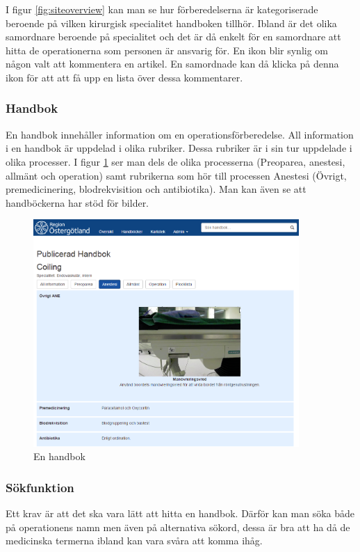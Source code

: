 I figur \ref{fig:siteoverview} kan man se hur förberedelserna är kategoriserade beroende på vilken kirurgisk specialitet handboken tillhör.
Ibland är det olika samordnare beroende på specialitet och det är då enkelt för en samordnare att hitta de operationerna som personen är ansvarig för.
En ikon blir synlig om någon valt att kommentera en artikel. En samordnade kan då klicka på denna ikon för att att få upp en lista över dessa kommentarer.

\subsubsection{Handbok}
En handbok innehåller information om en operationsförberedelse. All information i en handbok är uppdelad i olika rubriker. Dessa rubriker är i sin tur uppdelade i olika processer.
I figur \ref{fig:handbok} ser man dels de olika processerna (Preoparea, anestesi, allmänt och operation) samt rubrikerna som hör till processen Anestesi (Övrigt, premedicinering, blodrekvisition och  antibiotika). Man kan även se att handböckerna har stöd för bilder.

\begin{figure}[h!]
  \centering
  \includegraphics[width=0.9\textwidth]{images/site/handbok.png}
  \caption{En handbok}
  \label{fig:handbok}
\end{figure}



\subsubsection{Sökfunktion}
Ett krav är att det ska vara lätt att hitta en handbok.
Därför kan man söka både på operationens namn men även på alternativa sökord, dessa är bra att ha då de medicinska termerna ibland kan vara svåra att komma ihåg.

